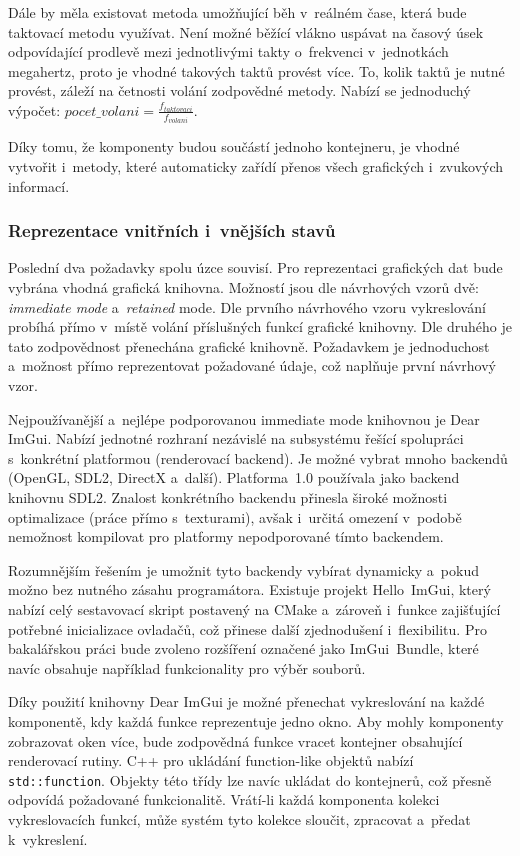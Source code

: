 Dále by měla existovat metoda umožňující běh v~reálném čase, která bude taktovací metodu využívat. Není možné běžící vlákno uspávat na časový úsek odpovídající prodlevě mezi jednotlivými takty o~frekvenci v~jednotkách megahertz, proto je vhodné takových taktů provést více. To, kolik taktů je nutné provést, záleží na četnosti volání zodpovědné metody. Nabízí se jednoduchý výpočet: $pocet\_volani= \frac{f_{taktovaci}}{f_{volani}}$.

Díky tomu, že komponenty budou součástí jednoho kontejneru, je vhodné vytvořit i~metody, které automaticky zařídí přenos všech grafických i~zvukových informací.

\subsubsection{Reprezentace vnitřních i~vnějších stavů}
Poslední dva požadavky spolu úzce souvisí. Pro reprezentaci grafických dat bude vybrána vhodná grafická knihovna. Možností jsou dle návrhových vzorů dvě: \emph{immediate mode} a~\emph{retained} mode. Dle prvního návrhového vzoru vykreslování probíhá přímo v~místě volání příslušných funkcí grafické knihovny. Dle druhého je tato zodpovědnost přenechána grafické knihovně. Požadavkem je jednoduchost a~možnost přímo reprezentovat požadované údaje, což naplňuje první návrhový vzor.

Nejpoužívanější a~nejlépe podporovanou immediate mode knihovnou je Dear ImGui.  Nabízí jednotné rozhraní nezávislé na subsystému řešící spolupráci s~konkrétní platformou (renderovací backend). Je možné vybrat mnoho backendů (OpenGL, SDL2, DirectX a~další). Platforma~1.0 používala jako backend knihovnu SDL2. Znalost konkrétního backendu přinesla široké možnosti optimalizace (práce přímo s~texturami), avšak i~určitá omezení v~podobě nemožnost kompilovat pro platformy nepodporované tímto backendem.

Rozumnějším řešením je umožnit tyto backendy vybírat dynamicky a~pokud možno bez nutného zásahu programátora. Existuje projekt Hello~ImGui, který nabízí celý sestavovací skript postavený na CMake a~zároveň i~funkce zajišťující potřebné inicializace ovladačů, což přinese další zjednodušení i~flexibilitu. Pro bakalářskou práci bude zvoleno rozšíření označené jako ImGui~Bundle, které navíc obsahuje například funkcionality pro výběr souborů.

Díky použití knihovny Dear ImGui je možné přenechat vykreslování na každé komponentě, kdy každá funkce reprezentuje jedno okno. Aby mohly komponenty zobrazovat oken více, bude zodpovědná funkce vracet kontejner obsahující renderovací rutiny. C++ pro ukládání function-like objektů nabízí \texttt{std::function}. Objekty této třídy lze navíc ukládat do kontejnerů, což přesně odpovídá požadované funkcionalitě. Vrátí-li každá komponenta kolekci vykreslovacích funkcí, může systém tyto kolekce sloučit, zpracovat a~předat k~vykreslení.

